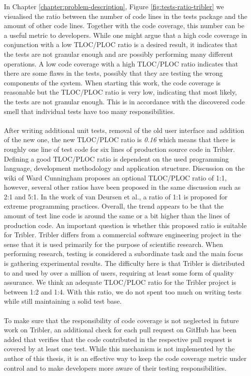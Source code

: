 \noindent In Chapter \ref{chapter:problem-description}, Figure \ref{fig:tests-ratio-tribler} we visualised the ratio between the number of code lines in the tests package and the amount of other code lines. Together with the code coverage, this number can be a useful metric to developers. While one might argue that a high code coverage in conjunction with a low TLOC/PLOC ratio is a desired result, it indicates that the tests are not granular enough and are possibly performing many different operations. A low code coverage with a high TLOC/PLOC ratio indicates that there are some flaws in the tests, possibly that they are testing the wrong components of the system. When starting this work, the code coverage is reasonable but the TLOC/PLOC ratio is very low, indicating that most likely, the tests are not granular enough. This is in accordance with the discovered code smell that individual tests have too many responsibilities.\\\\
After writing additional unit tests, removal of the old user interface and addition of the new one, the new TLOC/PLOC ratio is \emph{0.16} which means that there is roughly one line of test code for six lines of production source code in Tribler. Defining a good TLOC/PLOC ratio is dependent on the used programming language, development methodology and application structure. Discussion on the wiki of Ward Cunningham\cite{c2tlcratio} proposes an optional TLOC/PLOC ratio of 1:1, however, several other ratios have been proposed in the same discussion such as 2:1 and 5:1. In the work of van Deursen et al.\cite{van2001refactoring}, a ratio of 1:1 is proposed for extreme programming practices. Overall, the trend appears to be that the amount of test line code is around the same or a bit higher than the lines of production code. An important question is whether this proposed ratio is suitable for Tribler. Tribler differs from a commercial software engineering project in the sense that it is used primarily for the purpose of scientific research. When performing research, testing is considered a subordinate task and the main focus is gathering experimental results. The difficulty here is that Tribler is distributed to and used by over a million of users, requiring at least some form of quality assurance. We think an adequate TLOC/PLOC ratio for the Tribler project is between 1:2 and 1:4. With this ratio, we do not spent too much on writing tests while still maintaining a solid test base.\\\\
To make sure that the responsibility of code coverage is not neglected in future work on Tribler, an additional check for each pull request on GitHub has been added that verifies that the code contributed in the respective pull request is covered by at least one test. While this mechanism is not implemented by the author of this thesis, it is an effective way to keep the code coverage metric under control and to make developers more aware of their testing responsibilities.

